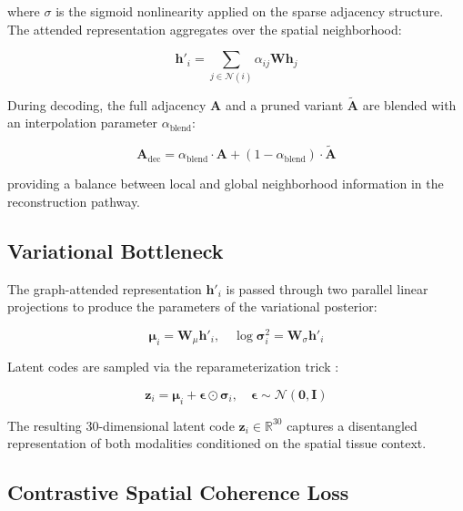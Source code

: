 \documentclass[conference]{IEEEtran}
\begin{document}
where $\sigma$ is the sigmoid nonlinearity applied on the sparse adjacency structure. The attended representation aggregates over the spatial neighborhood:

\begin{equation}
    \mathbf{h}'_i = \sum_{j \in \mathcal{N}(i)} \alpha_{ij} \mathbf{W} \mathbf{h}_j
\end{equation}

During decoding, the full adjacency $\mathbf{A}$ and a pruned variant $\tilde{\mathbf{A}}$ are blended with an interpolation parameter $\alpha_{\text{blend}}$:

\begin{equation}
    \mathbf{A}_{\text{dec}} = \alpha_{\text{blend}} \cdot \mathbf{A} + (1 - \alpha_{\text{blend}}) \cdot \tilde{\mathbf{A}}
\end{equation}

providing a balance between local and global neighborhood information in the reconstruction pathway.

\subsection{Variational Bottleneck}

The graph-attended representation $\mathbf{h}'_i$ is passed through two parallel linear projections to produce the parameters of the variational posterior:

\begin{equation}
    \boldsymbol{\mu}_i = \mathbf{W}_\mu \mathbf{h}'_i, \quad \log \boldsymbol{\sigma}^2_i = \mathbf{W}_\sigma \mathbf{h}'_i
\end{equation}

Latent codes are sampled via the reparameterization trick \cite{b8}:

\begin{equation}
    \mathbf{z}_i = \boldsymbol{\mu}_i + \boldsymbol{\epsilon} \odot \boldsymbol{\sigma}_i, \quad \boldsymbol{\epsilon} \sim \mathcal{N}(\mathbf{0}, \mathbf{I})
\end{equation}

The resulting 30-dimensional latent code $\mathbf{z}_i \in \mathbb{R}^{30}$ captures a disentangled representation of both modalities conditioned on the spatial tissue context.

\subsection{Contrastive Spatial Coherence Loss}
\end{document}
